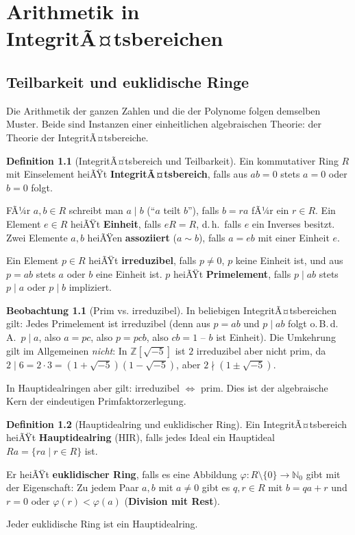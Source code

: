 ﻿\documentclass[a4paper,12pt]{report}
\theoremstyle{definition}
\newtheorem{definition}{Definition}
\newtheorem{beobachtung}{Beobachtung}
\begin{document}
\chapter{Arithmetik in IntegritÃ¤tsbereichen}

\section{Teilbarkeit und euklidische Ringe}

Die Arithmetik der ganzen Zahlen und die der Polynome folgen demselben
Muster. Beide sind Instanzen einer einheitlichen algebraischen Theorie:
der Theorie der IntegritÃ¤tsbereiche.

\begin{definition}[IntegritÃ¤tsbereich und Teilbarkeit]
    Ein kommutativer Ring $R$ mit Einselement heiÃŸt
    \textbf{IntegritÃ¤tsbereich}, falls aus $ab = 0$ stets $a = 0$
    oder $b = 0$ folgt.

    FÃ¼r $a, b \in R$ schreibt man $a \mid b$ (``$a$ teilt $b$''),
    falls $b = ra$ fÃ¼r ein $r \in R$. Ein Element $e \in R$ heiÃŸt
    \textbf{Einheit}, falls $eR = R$, d.\,h.\ falls $e$ ein
    Inverses besitzt. Zwei Elemente $a, b$ heiÃŸen \textbf{assoziiert}
    ($a \sim b$), falls $a = eb$ mit einer Einheit $e$.

    Ein Element $p \in R$ heiÃŸt \textbf{irreduzibel}, falls $p \neq 0$,
    $p$ keine Einheit ist, und aus $p = ab$ stets $a$ oder $b$ eine
    Einheit ist. $p$ heiÃŸt \textbf{Primelement}, falls $p \mid ab$
    stets $p \mid a$ oder $p \mid b$ impliziert.
\end{definition}

\begin{beobachtung}[Prim vs. irreduzibel]
    In beliebigen IntegritÃ¤tsbereichen gilt: Jedes Primelement ist
    irreduzibel (denn aus $p = ab$ und $p \mid ab$ folgt o.\,B.\,d.\,A.\
    $p \mid a$, also $a = pc$, also $p = pcb$, also $cb = 1$ -- $b$ ist Einheit).
    Die Umkehrung gilt im Allgemeinen \emph{nicht}: In
    $\mathbb{Z}[\sqrt{-5}]$ ist $2$ irreduzibel aber nicht prim, da
    $2 \mid 6 = 2 \cdot 3 = (1 + \sqrt{-5})(1 - \sqrt{-5})$, aber
    $2 \nmid (1 \pm \sqrt{-5})$.

    In Hauptidealringen aber gilt: irreduzibel $\Leftrightarrow$ prim.
    Dies ist der algebraische Kern der eindeutigen Primfaktorzerlegung.
\end{beobachtung}

\begin{definition}[Hauptidealring und euklidischer Ring]
    Ein IntegritÃ¤tsbereich heiÃŸt \textbf{Hauptidealring} (HIR), falls jedes
    Ideal ein Hauptideal $Ra = \{ra \mid r \in R\}$ ist.

    Er heiÃŸt \textbf{euklidischer Ring}, falls es eine Abbildung
    $\varphi : R \setminus \{0\} \to \mathbb{N}_0$ gibt mit der
    Eigenschaft: Zu jedem Paar $a, b$ mit $a \neq 0$ gibt es $q, r \in R$
    mit $b = qa + r$ und $r = 0$ oder $\varphi(r) < \varphi(a)$
    (\textbf{Division mit Rest}).

    Jeder euklidische Ring ist ein Hauptidealring.
\end{definition}
\end{document}
